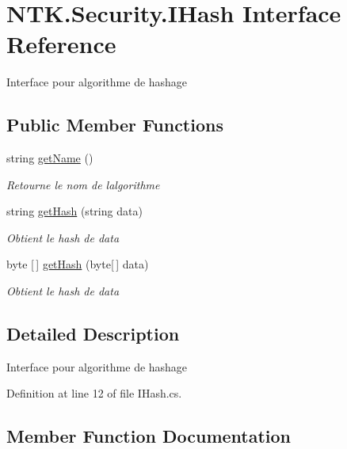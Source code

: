 \hypertarget{interface_n_t_k_1_1_security_1_1_i_hash}{}\section{N\+T\+K.\+Security.\+I\+Hash Interface Reference}
\label{interface_n_t_k_1_1_security_1_1_i_hash}


Interface pour algorithme de hashage  


\subsection*{Public Member Functions}
\begin{DoxyCompactItemize}
\item 
string \mbox{\hyperlink{interface_n_t_k_1_1_security_1_1_i_hash_a9858d52fe5afa1795618d6ba3dc13577}{get\+Name}} ()
\begin{DoxyCompactList}\small\item\em Retourne le nom de l\textquotesingle{}algorithme \end{DoxyCompactList}\item 
string \mbox{\hyperlink{interface_n_t_k_1_1_security_1_1_i_hash_a42e3d6c845d01ea8d406d20b0acbcce8}{get\+Hash}} (string data)
\begin{DoxyCompactList}\small\item\em Obtient le hash de data \end{DoxyCompactList}\item 
byte \mbox{[}$\,$\mbox{]} \mbox{\hyperlink{interface_n_t_k_1_1_security_1_1_i_hash_a7dee1d91baedafc8434b63f0c5461bfe}{get\+Hash}} (byte\mbox{[}$\,$\mbox{]} data)
\begin{DoxyCompactList}\small\item\em Obtient le hash de data \end{DoxyCompactList}\end{DoxyCompactItemize}


\subsection{Detailed Description}
Interface pour algorithme de hashage 



Definition at line 12 of file I\+Hash.\+cs.



\subsection{Member Function Documentation}
\mbox{\label{interface_n_t_k_1_1_security_1_1_i_hash_a42e3d6c845d01ea8d406d20b0acbcce8}} 
